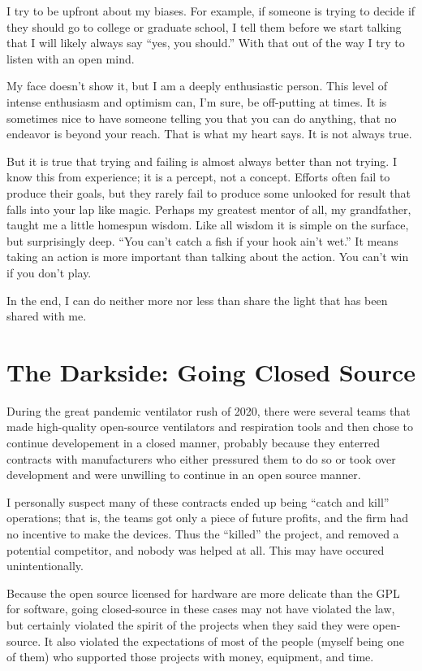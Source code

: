 \documentclass[
	fontsize=10pt, %
	twoside=false, %
	secnumdepth=1, %
]{kaobook}
\begin{document}
I try to be upfront about my biases. For example, if someone is trying to decide if they should go to college or graduate school, I tell them before we start talking that I will likely always say “yes, you should.” With that out of the way I try to listen with an open mind.

My face doesn’t show it, but I am a deeply enthusiastic person. This level of intense enthusiasm and optimism can, I’m sure, be off-putting at times. It is sometimes nice to have someone telling you that you can do anything, that no endeavor is beyond your reach. That is what my heart says. It is not always true.

But it is true that trying and failing is almost always better than not trying. I know this from experience; it is a percept, not a concept. Efforts often fail to produce their goals, but they rarely fail to produce some unlooked for result that falls into your lap like magic. Perhaps my greatest mentor of all, my grandfather, taught me a little homespun wisdom. Like all wisdom it is simple on the surface, but surprisingly deep. “You can’t catch a fish if your hook ain’t wet.” It means taking an action is more important than talking about the action. You can’t win if you don’t play.

In the end, I can do neither more nor less than share the light that has been shared with me.


\section{The Darkside: Going Closed Source}

During the great pandemic ventilator rush of 2020,
there were several teams that made high-quality
open-source ventilators and respiration tools and
then chose to continue developement in a closed manner,
probably because they enterred contracts with manufacturers
who either pressured them to do so or took over development
and were unwilling to continue in an open source manner.

I personally suspect many of these contracts ended
up being ``catch and kill'' operations; that is,
the teams got only a piece of future profits, and
the firm had no incentive to make the devices.
Thus the ``killed'' the project, and removed a potential
competitor, and nobody was helped at all.
This may have occured unintentionally.

Because the open source licensed for hardware are
more delicate than the GPL for software, going
closed-source in these cases may not have violated
the law, but certainly violated the spirit of the
projects when they said they were open-source.
It also violated the expectations of most
of the people (myself being one of them)
who supported those projects with money,
equipment, and time.
\end{document}
